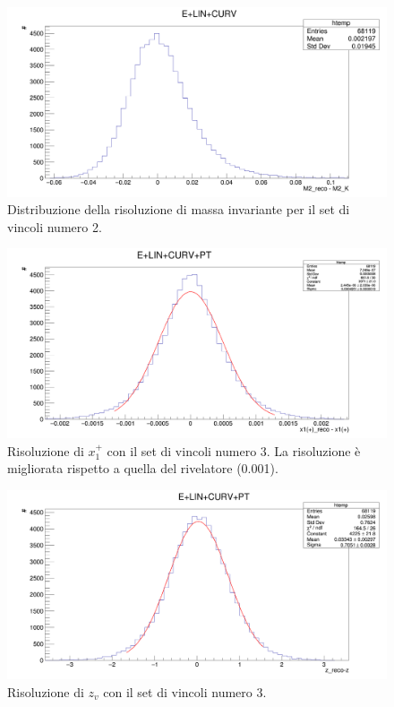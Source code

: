 \documentclass[8pt]{extarticle}
\begin{document}
\begin{figure}
	\begin{center}
		\includegraphics[scale=0.25]{set_2_inv} 
		\caption{Distribuzione della risoluzione di massa invariante per il set di vincoli numero 2.}
		\label{fig:set_2_inv}
	\end{center}
\end{figure}


\begin{figure}
	\begin{center}
		\includegraphics[scale=0.25]{set_3_x} 
		\caption{Risoluzione di $x_1^+$ con il set di vincoli numero 3. La risoluzione è migliorata rispetto a quella del rivelatore (0.001).}
		\label{fig:set_3_x}
	\end{center}
\end{figure}

\begin{figure}
	\begin{center}
		\includegraphics[scale=0.25]{set_3_z} 
		\caption{Risoluzione di $z_v$ con il set di vincoli numero 3.}
		\label{fig:set_3_z}
	\end{center}
\end{figure}
\end{document}
